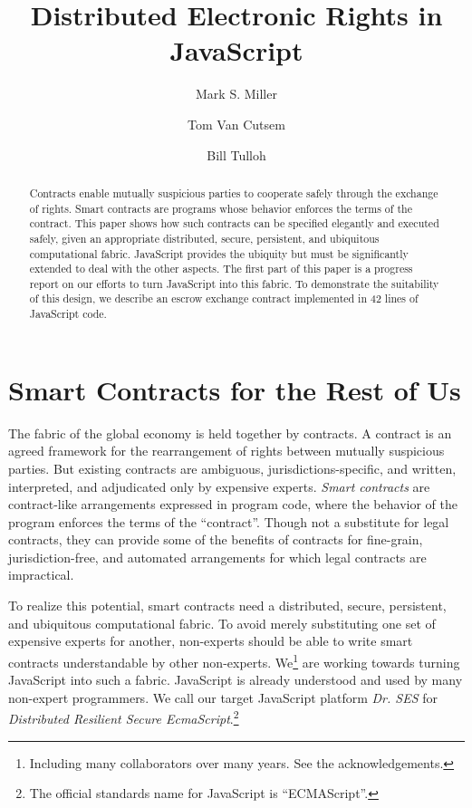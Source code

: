 \documentclass{llncs}
\begin{document}
\sloppypar


\title{Distributed Electronic Rights in JavaScript}

\author{Mark S. Miller \and Tom Van Cutsem \and Bill Tulloh }


\maketitle    

\begin{abstract}
Contracts enable mutually suspicious parties to cooperate safely through the exchange of rights. Smart contracts are programs whose behavior enforces the terms of the contract. This paper shows how such contracts can be specified elegantly and executed safely, given an appropriate distributed, secure, persistent, and ubiquitous computational fabric. JavaScript provides the ubiquity but must be significantly extended to deal with the other aspects. The first part of this paper is a progress report on our efforts to turn JavaScript into this fabric. To demonstrate the suitability of this design, we describe an escrow exchange contract implemented in 42 lines of JavaScript code.

\end{abstract}


\section{Smart Contracts for the Rest of Us}
\label{intro}

The fabric of the global economy is held together by contracts. A contract is an agreed framework for the rearrangement of rights between mutually suspicious parties. But existing contracts are ambiguous, jurisdictions-specific, and written, interpreted, and adjudicated only by expensive experts. \emph{Smart contracts} are contract-like arrangements expressed in program code, where the behavior of the program enforces the terms of the ``contract''\cite{szabo1997formalizing}. Though not a substitute for legal contracts, they can provide some of the benefits of contracts for fine-grain, jurisdiction-free, and automated arrangements for which legal contracts are impractical.

To realize this potential, smart contracts need a distributed, secure, persistent, and ubiquitous computational fabric. To avoid merely substituting one set of expensive experts for another, non-experts should be able to write smart contracts understandable by other non-experts. We\footnote{
%
Including many collaborators over many years. See the acknowledgements.
%
} are working towards turning JavaScript into such a fabric. JavaScript is already understood and used by many non-expert programmers. We call our target JavaScript platform \emph{Dr. SES} for \emph{Distributed Resilient Secure EcmaScript}.\footnote{
%
The official standards name for JavaScript is ``ECMAScript''.
%
} 
\end{document}
